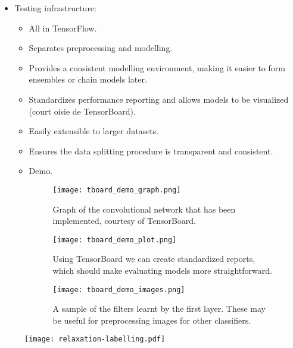 \documentclass[11pt]{article} %
\begin{document}
\begin{itemize}
\begin{itemize}
\begin{figure}[t!]
\begin{subfigure}[t]{0.3\textwidth}
			\texttt{[image: unfiltered\_input\_to\_GDA.png]}
			\caption{Query image.}
   			\label{fig:c} 
		\end{subfigure}
		\begin{subfigure}[t]{0.3\textwidth}
			\texttt{[image: GDA\_unfiltered\_log\_odds.png]}
			\caption{Log-odds of query image.}
   			\label{fig:d} 
		\end{subfigure}
		\end{figure}
	\item Testing infrastructure:
		\begin{itemize}
			\item All in TensorFlow.
			\item Separates preprocessing and modelling.
			\item Provides a consistent modelling environment, making it easier to form ensembles or chain models later.
			\item Standardizes performance reporting and allows models to be visualized (court oisie de TensorBoard).
			\item Easily extensible to larger datasets.
			\item Ensures the data splitting procedure is transparent and consistent.
			\item Demo.
			\begin{figure}
			\centering
				\texttt{[image: tboard\_demo\_graph.png]}
				\caption{Graph of the convolutional network that has been implemented, courtesy of TensorBoard.}
			\end{figure}
			\begin{figure}
				\texttt{[image: tboard\_demo\_plot.png]}
				\caption{Using TensorBoard we can create standardized reports, which should make evaluating models more straightforward.}
			\end{figure}
			\begin{figure}
				\texttt{[image: tboard\_demo\_images.png]}
				\caption{A sample of the filters learnt by the first layer. These may be useful for preprocessing images for other classifiers.}
			\end{figure}
		\end{itemize}
	\end{itemize}
\end{itemize}

\begin{figure}
	\texttt{[image: relaxation-labelling.pdf]}
\end{figure}
\end{document}
